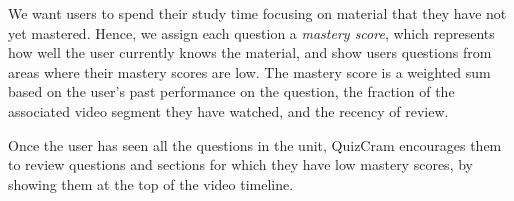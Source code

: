 \documentclass{sigchi}
\begin{document}



We want users to spend their study time focusing on material that they have not yet mastered. Hence, we assign each question a \emph{mastery score}, which represents how well the user currently knows the material,  and show users questions from areas where their mastery scores are low. The mastery score is a weighted sum based on the user's past performance on the question, the fraction of the associated video segment they have watched, and the recency of review.

Once the user has seen all the questions in the unit, QuizCram encourages them to review questions and sections for which they have low mastery scores, by showing them at the top of the video timeline.
\end{document}
